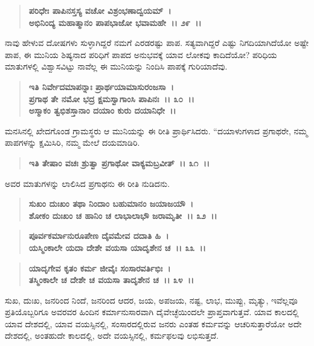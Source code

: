 \begin{verse}
\textbf{ಪರಿಧೇಃ ಪಾಪಿನಸ್ತಸ್ಯ ವಚೋ ವಿಶ್ರಂಭಣಾದ್ವಯಮ್~।}\\\textbf{ಅಭಿನಿಂದ್ಯ ಮಹಾತ್ಮಾನಂ ಪಾಪಭಾಜೋ ಭವಾಮಹೇ~।। ೨೯~।।}
\end{verse}

ನಾವು ಹೇಳುವ ದೋಷಗಳು ಸುಳ್ಳಾಗಿದ್ದರೆ ನಮಗೆ ಎರಡರಷ್ಟು ಪಾಪ. ಸತ್ಯವಾಗಿದ್ದರೆ ಎಷ್ಟು ನಿಗದಿಯಾಗಿದೆಯೋ ಅಷ್ಟೇ ಪಾಪ, ಈ ಮುನಿಯ ಶಿಷ್ಯನಾದ ಪರಿಧಿಗೆ ಪಾಪದ ಅನುಭವಕ್ಕೆ ಯಾವ ಲೋಕವು ಕಾದಿದೆಯೋ? ಪರಿಧಿಯ ಮಾತುಗಳಲ್ಲಿ ವಿಶ್ವಾಸವಿಟ್ಟು ನಾವೆಲ್ಲ ಈ ಮುನಿಯನ್ನು ನಿಂದಿಸಿ ಪಾಪಕ್ಕೆ ಗುರಿಯಾದೆವು.

\begin{verse}
\textbf{ಇತಿ ನಿರ್ವೇದಮಾಪನ್ನಾಃ ಪ್ರಾರ್ಥಯಾಮಾಸುರಂಜಸಾ~।}\\\textbf{ಪ್ರಗಾಥ ತೇ ನಮೋ ಭದ್ರ ಕ್ಷಮಸ್ವಾಗಾಂಸಿ ಪಾಪಿನಃ~।। ೩೦~।।}\\\textbf{ಅಸ್ಮಾಕಂ ತ್ವಭಿಶಸ್ತಾನಾಂ ದಯಾಂ ಕುರು ದಯಾನಿಧೇ~।।}
\end{verse}

ಮನಸಿನಲ್ಲಿ ಖೇದಗೊಂಡ ಗ್ರಾಮಸ್ಥರು ಆ ಮುನಿಯನ್ನು ಈ ರೀತಿ ಪ್ರಾರ್ಥಿಸಿದರು. “ದಯಾಳುಗಳಾದ ಪ್ರಗಾಥರೇ, ನಮ್ಮ ಪಾಪಗಳನ್ನು ಕ್ಷಮಿಸಿರಿ, ನಮ್ಮ ಮೇಲೆ ದಯಮಾಡಿರಿ.

\begin{verse}
\textbf{ಇತಿ ತೇಷಾಂ ವಚಃ ಶ್ರುತ್ವಾ ಪ್ರಗಾಥೋ ವಾಕ್ಯಮಬ್ರವೀತ್~।। ೩೧~।।}
\end{verse}

ಅವರ ಮಾತುಗಳನ್ನು ಲಾಲಿಸಿದ ಪ್ರಗಾಥನು ಈ ರೀತಿ ನುಡಿದನು.

\begin{verse}
\textbf{ಸುಖಂ ದುಃಖಂ ತಥಾ ನಿಂದಾಂ ಬಹುಮಾನಂ ಜಯಾಜಯೌ~।}\\\textbf{ಶೋಕಂ ದುಃಖಂ ಚ ಹಾನಿಂ ಚ ಲಾಭಾಲಾಭೌ ಜರಾಮೃತೀ~।। ೩೨~।।}
\end{verse}

\begin{verse}
\textbf{ಪೂರ್ವಕರ್ಮಾನುರೂಪೇಣ ದೈವಮೇವ ದದಾತಿ ಹಿ~।}\\\textbf{ಯಸ್ಮಿಂಕಾಲೇ ಯದಾ ದೇಶೇ ವಯಸಾ ಯಾದೃಶೇನ ಚ~।। ೩೩~।।}
\end{verse}

\begin{verse}
\textbf{ಯಾದೃಗೇವ ಕೃತಂ ಕರ್ಮ ಜೀವೈಃ ಸಂಸಾರವರ್ತಿಭಿಃ~।}\\\textbf{ತಸ್ಮಿಂಕಾಲೇ ಚ ದೇಶೇ ಚ ವಯಸಾ ತಾದೃಶೇನ ಚ~।। ೩೪~।।}
\end{verse}

ಸುಖ, ದುಃಖ, ಜನರಿಂದ ನಿಂದೆ, ಜನರಿಂದ ಆದರ, ಜಯ, ಅಪಜಯ, ನಷ್ಟ, ಲಾಭ, ಮುಪ್ಪು, ಮೃತ್ಯು, ಇವೆಲ್ಲವೂ ಪ್ರತಿಯೊಬ್ಬರಿಗೂ ಅವರವರ ಹಿಂದಿನ ಕರ್ಮಾನುಸಾರವಾಗಿ ದೈವೇಚ್ಛೆಯಿಂದಲೇ ಪ್ರಾಪ್ತವಾಗುತ್ತವೆ. ಯಾವ ಕಾಲದಲ್ಲಿ ಯಾವ ದೇಶದಲ್ಲಿ, ಯಾವ ವಯಸ್ಸಿನಲ್ಲಿ, ಸಂಸಾರದಲ್ಲಿರುವ ಜನರು ಎಂತಹ ಕರ್ಮವನ್ನು ಆಚರಿಸುತ್ತಾರೆಯೋ ಅದೇ ದೇಶದಲ್ಲಿ, ಅಂತಹುದೇ ಕಾಲದಲ್ಲಿ, ಅದೇ ವಯಸ್ಸಿನಲ್ಲಿ, ಕರ್ಮಫಲವು ಲಭಿಸುತ್ತದೆ.


